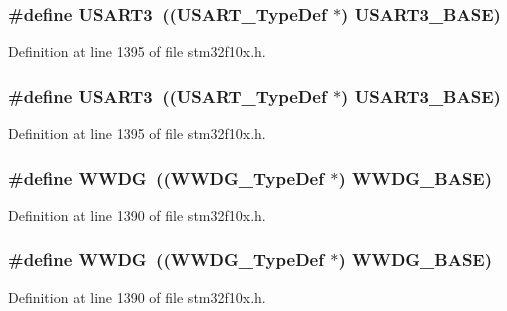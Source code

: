 \subsubsection[{\texorpdfstring{U\+S\+A\+R\+T3}{USART3}}]{\setlength{\rightskip}{0pt plus 5cm}\#define U\+S\+A\+R\+T3~(({\bf U\+S\+A\+R\+T\+\_\+\+Type\+Def} $\ast$) {\bf U\+S\+A\+R\+T3\+\_\+\+B\+A\+SE})}\hypertarget{group___peripheral__declaration_ga2350115553c1fe0a7bc14e6a7ec6a225}{}\label{group___peripheral__declaration_ga2350115553c1fe0a7bc14e6a7ec6a225}


Definition at line 1395 of file stm32f10x.\+h.

\subsubsection[{\texorpdfstring{U\+S\+A\+R\+T3}{USART3}}]{\setlength{\rightskip}{0pt plus 5cm}\#define U\+S\+A\+R\+T3~(({\bf U\+S\+A\+R\+T\+\_\+\+Type\+Def} $\ast$) {\bf U\+S\+A\+R\+T3\+\_\+\+B\+A\+SE})}\hypertarget{group___peripheral__declaration_ga2350115553c1fe0a7bc14e6a7ec6a225}{}\label{group___peripheral__declaration_ga2350115553c1fe0a7bc14e6a7ec6a225}


Definition at line 1395 of file stm32f10x.\+h.

\subsubsection[{\texorpdfstring{W\+W\+DG}{WWDG}}]{\setlength{\rightskip}{0pt plus 5cm}\#define W\+W\+DG~(({\bf W\+W\+D\+G\+\_\+\+Type\+Def} $\ast$) {\bf W\+W\+D\+G\+\_\+\+B\+A\+SE})}\hypertarget{group___peripheral__declaration_ga9821fd01757986612ddb8982e2fe27f1}{}\label{group___peripheral__declaration_ga9821fd01757986612ddb8982e2fe27f1}


Definition at line 1390 of file stm32f10x.\+h.

\subsubsection[{\texorpdfstring{W\+W\+DG}{WWDG}}]{\setlength{\rightskip}{0pt plus 5cm}\#define W\+W\+DG~(({\bf W\+W\+D\+G\+\_\+\+Type\+Def} $\ast$) {\bf W\+W\+D\+G\+\_\+\+B\+A\+SE})}\hypertarget{group___peripheral__declaration_ga9821fd01757986612ddb8982e2fe27f1}{}\label{group___peripheral__declaration_ga9821fd01757986612ddb8982e2fe27f1}


Definition at line 1390 of file stm32f10x.\+h.

